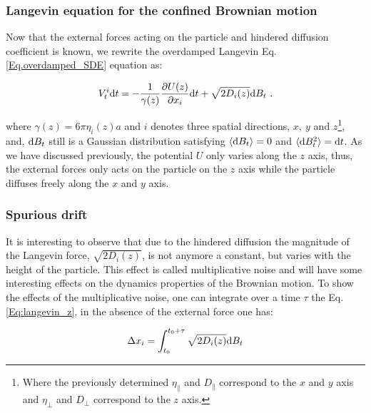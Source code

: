 \subsubsection{Langevin equation for the confined Brownian motion}

Now that the external forces acting on the particle and hindered diffusion coefficient is known, we rewrite the overdamped Langevin Eq.\ref{Eq.overdamped_SDE} equation as:

\begin{equation}
	V_t^i \textnormal{d}t  = -\frac{1}{\gamma(z)}\frac{\partial U(z)}{\partial x_i}  \textnormal{d}t + \sqrt{2D_i (z)}  \textnormal{d}B_t ~.
	\label{Eq:langevin_z}
\end{equation}

where $\gamma(z) = 6 \pi \eta_i(z) a$ and $i$ denotes three spatial directions, $x,~ y$ and $z$\footnote{Where the previously determined $\eta_\parallel$ and $D_\parallel$ correspond to the $x$ and $y$ axis and $\eta_\bot$ and $D_\bot$ correspond to the $z$ axis.}, and,  $ \textnormal{d}B_t$ still is a Gaussian distribution satisfying $\langle \textnormal{d}B_t \rangle = 0$ and $\langle \textnormal{d}B_t ^2 \rangle = \textnormal{d}t$. As we have discussed previously, the potential $U$ only varies along the $z$ axis, thus, the external forces only acts on the particle on the $z$ axis while the particle diffuses freely along the $x$ and $y$ axis. 

\subsubsection{Spurious drift}

It is interesting to observe that due to the hindered diffusion the magnitude of the Langevin force, $\sqrt{2D_i(z)}$, is not anymore a constant, but varies with the height of the particle. This effect is called multiplicative noise and will have some interesting effects on the dynamics properties of the Brownian motion. To show the effects of the multiplicative noise, one can integrate over a time $\tau$ the Eq.\ref{Eq:langevin_z}, in the absence of the external force one has:

\begin{equation}
	\Delta x_i = \int_{t_0} ^{t_0 + \tau} \sqrt{2D_i(z)}\textnormal{d}B_t
	\label{int}
\end{equation}

